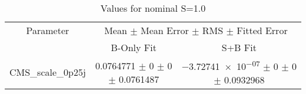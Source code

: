 \begin{table}
\centering
\caption{Values for nominal S=1.0}
\begin{tabular}{ccc}
\toprule
Parameter & \multicolumn{2}{c}{Mean $\pm$ Mean Error $\pm$ RMS $\pm$ Fitted Error}\\
 & B-Only Fit & S+B Fit\\
\midrule
CMS\_scale\_0p25j & \num{0.0764771} $\pm$ \num{0} $\pm$ \num{0} $\pm$ \num{0.0761487} & \num{-3.72741e-07} $\pm$ \num{0} $\pm$ \num{0} $\pm$ \num{0.0932968}\\
\bottomrule
\end{tabular}
\end{table}